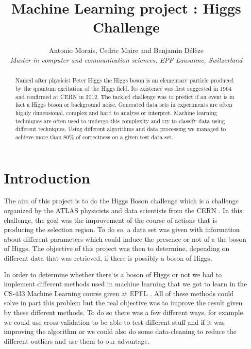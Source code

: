 \documentclass[10pt,conference,compsocconf]{IEEEtran}
\begin{document}
\title{Machine Learning project : Higgs Challenge}

\author{
  Antonio Morais, Cedric Maire and Benjamin D\'el\`eze \\
  \textit{Master in computer and communication sciences, EPF Lausanne, Switzerland}
}

\maketitle

\begin{abstract}
  Named after physicist Peter Higgs the Higgs boson is an elementary particle produced by the quantum excitation of the Higgs field. Its existence was first suggested in 1964 and confirmed at CERN in 2012. The tackled challenge was to predict if an event is in fact a Higgs boson or background noise. Generated data sets in experiments are often highly dimensional, complex and hard to analyse or interpret. Machine learning techniques are often used to undergo this complexity and try to classify data using different techniques. Using different algorithms and data processing we managed to achieve more than 80\% of correctness on a given test data set.
\end{abstract}

\section{Introduction}

The aim of this project is to do the Higgs Boson challenge which is a challenge organized by the ATLAS physicists and data scientists from the CERN \cite{higgsChallenge14}. In this challenge, the goal was the improvement of the course of actions that is producing the selection region. To do so, a data set was given with information about different parameters which could induce the presence or not of a the boson of Higgs. The objective of this project was then to determine, depending on different data that was retrieved, if there is possibly a boson of Higgs.

In order to determine whether there is a boson of Higgs or not we had to implement different methods used in machine learning that we got to learn in the CS-433 Machine Learning course given at EPFL \cite{MLcourse18}. All of these methods could solve in part this problem but the real objective was to improve the result given by these different methods. To do so there was a few different ways, for example we could use cross-validation to be able to test different stuff and if it was improving the algorithm or we could also do some data-cleaning to reduce the different outliers and use them to our advantage.
\end{document}
